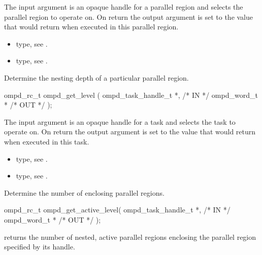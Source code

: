 \argdesc
The input argument  is an opaque handle for a parallel region and selects the parallel region to operate on.
On return the output argument  is set to the value that  would return when
executed in this parallel region.

\crossreferences
\begin{itemize}
	\item {} type, see .
	\item {} type, see .
\end{itemize}


\summary
Determine the nesting depth of a particular parallel region.

\format
\cspecificstart
\begin{boxedcode}
ompd\_rc\_t ompd\_get\_level (
  ompd\_task\_handle\_t *,                                 /* IN */
  ompd\_word\_t *                                         /* OUT */
); 
\end{boxedcode}
\cspecificend

\descr

\argdesc
The input argument  is an opaque handle for a task and selects the task to operate on.
On return the output argument  is set to the value that  would return when
executed in this task.


\crossreferences
\begin{itemize}
	\item {} type, see .
	\item {} type, see .
\end{itemize}


\summary
Determine the number of enclosing  parallel regions.

\format
\cspecificstart
\begin{boxedcode}
ompd\_rc\_t ompd\_get\_active\_level(
  ompd\_task\_handle\_t *,                                 /* IN */
  ompd\_word\_t *                                         /* OUT */
); 
\end{boxedcode}
\cspecificend

\descr
{} returns the number of nested, active
parallel regions enclosing the parallel region specified by its handle.

